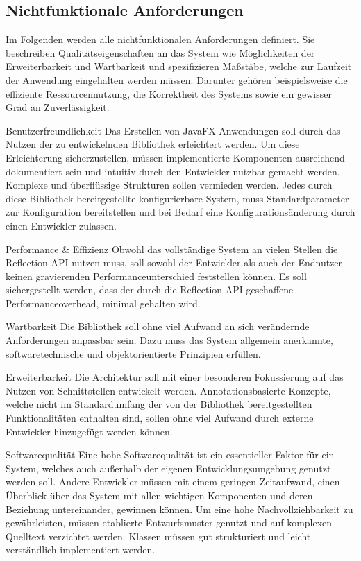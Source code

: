 \subsection{Nichtfunktionale Anforderungen}
\label{anforderungsanalyse_nichtfunktional}
Im Folgenden werden alle nichtfunktionalen Anforderungen definiert. Sie beschreiben Qualitätseigenschaften an das System wie Möglichkeiten der Erweiterbarkeit und Wartbarkeit und spezifizieren Maßstäbe, welche zur Laufzeit der Anwendung eingehalten werden müssen. Darunter gehören beispielsweise die effiziente Ressourcennutzung, die Korrektheit des Systems sowie ein gewisser Grad an Zuverlässigkeit.
\begin{nreq}{Benutzerfreundlichkeit}
	Das Erstellen von JavaFX Anwendungen soll durch das Nutzen der zu entwickelnden Bibliothek erleichtert werden. Um diese Erleichterung sicherzustellen, müssen implementierte Komponenten ausreichend dokumentiert sein und intuitiv durch den Entwickler nutzbar gemacht werden. Komplexe und überflüssige Strukturen sollen vermieden werden. Jedes durch diese Bibliothek bereitgestellte konfigurierbare System, muss Standardparameter zur Konfiguration bereitstellen und bei Bedarf eine Konfigurationsänderung durch einen Entwickler zulassen.
\end{nreq}
\begin{nreq}{Performance \& Effizienz}
	Obwohl das vollständige System an vielen Stellen die Reflection API nutzen muss, soll sowohl der Entwickler als auch der Endnutzer keinen gravierenden Performanceunterschied feststellen können. Es soll sichergestellt werden, dass der durch die Reflection API geschaffene Performanceoverhead, minimal gehalten wird.
\end{nreq}
\begin{nreq}{Wartbarkeit}
	Die Bibliothek soll ohne viel Aufwand an sich verändernde Anforderungen anpassbar sein. Dazu muss das System allgemein anerkannte, softwaretechnische und objektorientierte Prinzipien erfüllen.
\end{nreq}
\begin{nreq}{Erweiterbarkeit}
	Die Architektur soll mit einer besonderen Fokussierung auf das Nutzen von Schnittstellen entwickelt werden. Annotationsbasierte Konzepte, welche nicht im Standardumfang der von der Bibliothek bereitgestellten Funktionalitäten enthalten sind, sollen ohne viel Aufwand durch externe Entwickler hinzugefügt werden können.
\end{nreq}
\begin{nreq}{Softwarequalität}
	Eine hohe Softwarequalität ist ein essentieller Faktor für ein System, welches auch außerhalb der eigenen Entwicklungsumgebung genutzt werden soll. Andere Entwickler müssen mit einem geringen Zeitaufwand, einen Überblick über das System mit allen wichtigen Komponenten und deren Beziehung untereinander, gewinnen können. Um eine hohe Nachvollziehbarkeit zu gewährleisten, müssen etablierte Entwurfsmuster genutzt und auf komplexen Quelltext verzichtet werden. Klassen müssen gut strukturiert und leicht verständlich implementiert werden.
\end{nreq}
